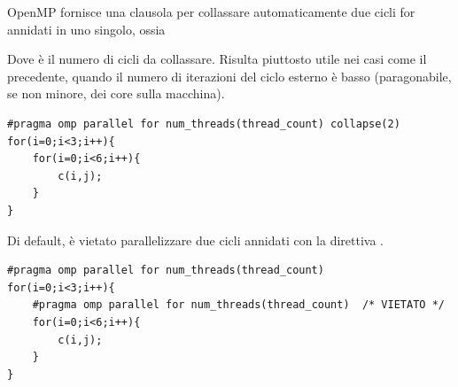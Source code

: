 \documentclass[10pt, letterpaper]{report}
\begin{document}
OpenMP fornisce una clausola per collassare automaticamente due cicli for annidati in uno singolo, ossia  
\begin{quote}
\end{quote}
Dove  è il numero di cicli da collassare. Risulta piuttosto utile nei casi come il precedente, quando il numero di iterazioni del ciclo esterno è basso (paragonabile, se non minore, dei core sulla macchina).
\begin{lstlisting}[style=CStyle]
#pragma omp parallel for num_threads(thread_count) collapse(2)
for(i=0;i<3;i++){
    for(i=0;i<6;i++){
        c(i,j);
    }
}
\end{lstlisting}
Di default, è vietato parallelizzare due cicli annidati con la direttiva .
\begin{lstlisting}[style=CStyle]
#pragma omp parallel for num_threads(thread_count) 
for(i=0;i<3;i++){
    #pragma omp parallel for num_threads(thread_count)  /* VIETATO */
    for(i=0;i<6;i++){
        c(i,j);
    }
}
\end{lstlisting}
\end{document}
